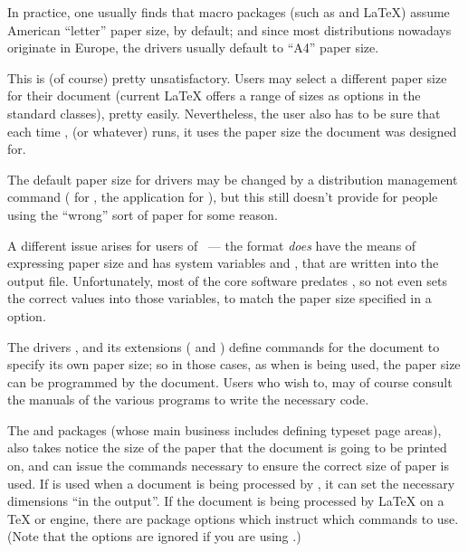 In practice, one usually finds that macro packages (such as \plaintex{} and
\LaTeX{}) assume American ``letter'' paper size, by default; and since
most distributions nowadays originate in Europe, the drivers usually
default to  ``A4'' paper size.

This is (of course) pretty unsatisfactory.  Users may select a
different paper size for their document (current \LaTeX{} offers a
range of sizes as options in the standard classes), pretty easily.
Nevertheless, the user also has to be sure that each time
,  (or whatever) runs, it uses the
paper size the document was designed for.

The default paper size for  drivers may be changed by a
distribution management command ( for \texlive{},
the  application for \miktex{}), but this still
doesn't provide for people using the ``wrong'' sort of paper for some
reason.

A different issue arises for users of \PDFTeX{}~--- the
 format \emph{does} have the means of expressing paper size
and \PDFTeX{} has system variables  and
, that are written into the output  file.
Unfortunately, most of the core software predates \PDFTeX{}, so not even
\PDFLaTeX{} sets the correct values into those variables, to match the
paper size specified in a  option.

The  drivers ,  and its
extensions ( and ) define
 commands for the document to specify its own paper size;
so in those cases, as when \PDFTeX{} is being used, the
paper size can be programmed by the document.  Users who wish to, may
of course consult the manuals of the various programs to write the
necessary code.

The  and  packages (whose main
business includes defining
typeset page areas), also takes notice the size of the paper that the
document is going to be printed on, and can issue the commands
necessary to ensure the correct size of paper is used.  If
 is used when a document is being processed by
\PDFLaTeX{}, it can set the necessary dimensions ``in the output''.
If the document is being processed by \LaTeX{} on a \TeX{} or \eTeX{}
engine, there are package options which instruct 
which  commands to use.  (Note that the options are
ignored if you are using \PDFLaTeX{}.)

